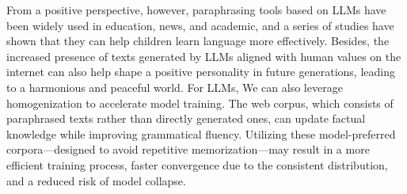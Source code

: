 From a positive perspective, however, paraphrasing tools based on LLMs have been widely used in education, news, and academic, and a series of studies have shown that they can help children learn language more effectively.
Besides, the increased presence of texts generated by LLMs aligned with human values on the internet can also help shape a positive personality in future generations, leading to a harmonious and peaceful world.
For LLMs, We can also leverage homogenization to accelerate model training. 
The web corpus, which consists of paraphrased texts rather than directly generated ones, can update factual knowledge while improving grammatical fluency. 
Utilizing these model-preferred corpora—designed to avoid repetitive memorization—may result in a more efficient training process, faster convergence due to the consistent distribution, and a reduced risk of model collapse.



